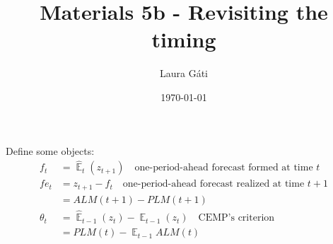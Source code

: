 \documentclass[11pt]{article}
\renewcommand{\[}{\begin{equation}}
\renewcommand{\]}{\end{equation}}
\DeclareMathOperator{\E}{\mathbb{E}}
\begin{document}
\linespread{1.0}

\title{Materials 5b - Revisiting the timing}
\author{Laura G\'ati} 
\date{\today}
\maketitle




Define some objects:
\begin{align}
f_t &= \hat{\E}_t(z_{t+1}) \quad \text{one-period-ahead forecast formed at time } t \\
fe_t & = z_{t+1}-f_t \quad \text{one-period-ahead forecast realized at time } t+1 \\
& = ALM(t+1) - PLM(t+1) \\
\theta_t &=  \hat{\E}_{t-1}(z_{t}) - \E_{t-1}(z_{t}) \quad \text{CEMP's criterion} \\
& = PLM(t) - \E_{t-1}ALM(t)
\end{align}
\end{document}
